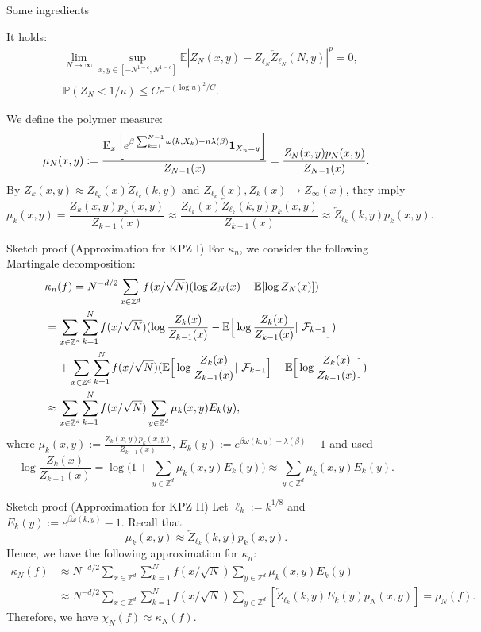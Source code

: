 \documentclass[10pt]{beamer}
\newcommand{\E}{\mathbb{E}}
\newcommand{\Z}{\mathbb{Z}}
\def\al#1{\begin{align*}#1\end{align*}}
\begin{document}
\begin{frame}{Some ingredients}
\begin{screen}
It holds:
        \begin{align*}
     &   \lim_{N\to\infty}\sup_{x,y\in [-N^{1-c},N^{1-c}]}\E|Z_N(x,y)-Z_{\ell_N} \overleftarrow{Z}_{\ell_N}(N,y)|^p=0,\\
    &\mathbb{P}(Z_{N}<1/u)\leq C e^{-(\log{u})^2/C}.
        \end{align*}
\end{screen}
 We define the polymer measure:
$$\mu_{N}(x,y):= \frac{{\rm E}_x\left[e^{\beta\sum_{k=1}^{N-1}\omega(k,X_k)-n\lambda(\beta)}\mathbf{1}_{X_n=y}\right]}{Z_{N-1}(x)}=\frac{Z_N(x,y)p_N(x,y)}{Z_{N-1}(x)}.$$
By  $Z_k(x,y)\approx Z_{\ell_k}(x)\overleftarrow{Z}_{\ell_k}(k,y)$ and $Z_{\ell_k}(x), Z_k(x)\to Z_\infty(x)$, they imply
$$\mu_k(x,y)=\frac{Z_k(x,y)p_k(x,y)}{Z_{k-1}(x)}\approx \frac{Z_{\ell_k}(x)\overleftarrow{Z}_{\ell_k}(k,y)p_k(x,y)}{Z_{k-1}(x)} \approx \overleftarrow{Z}_{\ell_k}(k,y)p_k(x,y).$$
\end{frame}
\begin{frame}{Sketch proof (Approximation for KPZ I)}
 For $\kappa_n$,  we consider the following Martingale decomposition:
\al{
& \kappa_n(f)= N^{-d/2}\sum_{x\in \Z^d}f(x/\sqrt{N}) (\log{Z_N(x)}-\E[\log{Z_N(x)}])\\
 &=\sum_{x\in \Z^d}\sum_{k=1}^N  f(x/\sqrt{N}) (\log{\frac{Z_k(x)}{Z_{k-1}(x)}}-\E\Big[\log{\frac{Z_k(x)}{Z_{k-1}(x)}}|~\mathcal{F}_{k-1}\Big])\\
 &\hspace{4mm}+\sum_{x\in \Z^d} \sum_{k=1}^N  f(x/\sqrt{N}) (\E\Big[\log{\frac{Z_k(x)}{Z_{k-1}(x)}}|~\mathcal{F}_{k-1}\Big]-\E\Big[\log{\frac{Z_k(x)}{Z_{k-1}(x)}}\Big])\\
 &\approx  \sum_{x\in \Z^d} \sum_{k=1}^N  f(x/\sqrt{N}) \sum_{y\in \Z^d} \mu_{k}(x,y) E_k(y), 
}
where $\mu_k(x,y):=\frac{Z_k(x,y)p_k(x,y)}{Z_{k-1}(x)},\, E_k(y):=e^{\beta \omega(k,y)-\lambda(\beta)}-1$ and used $$\log{\frac{Z_k(x)}{Z_{k-1}(x)}}= \log{\Big(1+\sum_{y\in \Z^d} \mu_{k}(x,y) E_k(y)\Big)}\approx  \sum_{y\in \Z^d} \mu_{k}(x,y) E_k(y).$$
\end{frame}

\begin{frame}{Sketch proof (Approximation for KPZ II)}
Let $\ell_k:=k^{1/8}$ and $E_k(y):=e^{\beta \omega(k,y)}-1$. Recall that
$$\mu_k(x,y) \approx \overleftarrow{Z}_{\ell_k}(k,y)p_k(x,y).$$
Hence, we have the following approximation for $\kappa_n$: 
\al{
\kappa_N(f)&\approx N^{-d/2}\sum_{x\in \Z^d}\sum_{k=1}^N  f(x/\sqrt{N})  \sum_{y\in \Z^d} \mu_{k}(x,y) E_k(y)\\
&\approx   N^{-d/2}\sum_{x\in \Z^d} \sum_{k=1}^{N} f(x/\sqrt{N})\sum_{y\in \Z^d} \left[ 
\overleftarrow{Z}_{\ell_k}(k,y)E_k(y) p_N(x,y)\right]=\rho_N(f).
}
Therefore, we have $\chi_N(f)\approx \kappa_N(f)$.
\end{frame}
\end{document}
